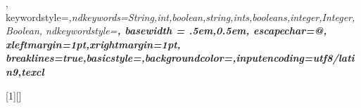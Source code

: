 {{},
  keywordstyle=\color{dblue}\slshape,ndkeywords={String,int,boolean,string,ints,booleans,integer,Integer,Boolean},
  ndkeywordstyle=\color{dviolet}\bfseries,
  basewidth  = {.5em,0.5em},
  escapechar=@,
  xleftmargin=1pt,xrightmargin=1pt,
  breaklines=true,basicstyle=\ttfamily\linespread{1.0}\small,backgroundcolor=\color{colorsy},inputencoding=utf8/latin9,texcl
}

\newcommand{\core}[1]{ 
  \medskip \begin{tcolorbox}[
    enhanced,breakable,
    boxsep=0pt,top=0pt,bottom=0pt,left=7mm,right=1mm,
    toprule=0.1mm,leftrule=0.1mm,rightrule=0.25mm,bottomrule=0.25mm,shadow={0.2mm}{-0.2mm}{0mm}{dgray},
    overlay unbroken and first={\node (logo) at ([xshift=6mm,yshift=-5mm]frame.north west) {#1}; %
    },
    colframe=dgray,titlerule=-0.2mm,toptitle=3mm,coltitle=black,fonttitle=\bfseries,
    lines before break=6, pad at break*=10pt
}


  [1][]{\lstset{language=ludii,#1}}{} 
  \newenvironment{boxex}
    {\stepcounter{cntEx} \core{\bcludii} ,colback=colorex,title style={color=colorex},title=~ Ludeme \thecntEx]}
    {\end{tcolorbox}} %
